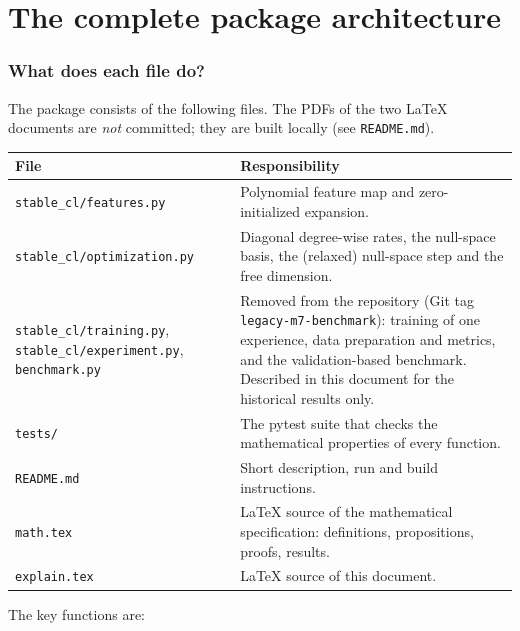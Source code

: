 \documentclass[11pt,a4paper]{article}
\newcommand{\code}[1]{\texttt{#1}}
\begin{document}
\part{The complete package architecture}

\section{What does each file do?}

The package consists of the following files. The PDFs of the two \LaTeX{} documents are \emph{not} committed; they are built locally (see \code{README.md}).

\begin{center}
\begin{tabular}{@{}lp{9.6cm}@{}}
\toprule
File & Responsibility\\
\midrule
\code{stable\_cl/features.py} & Polynomial feature map and zero-initialized expansion.\\
\code{stable\_cl/optimization.py} & Diagonal degree-wise rates, the null-space basis, the (relaxed) null-space step and the free dimension.\\
\code{stable\_cl/training.py}, \code{stable\_cl/experiment.py}, \code{benchmark.py} & Removed from the repository (Git tag \code{legacy-m7-benchmark}): training of one experience, data preparation and metrics, and the validation-based benchmark. Described in this document for the historical results only.\\
\code{tests/} & The pytest suite that checks the mathematical properties of every function.\\
\code{README.md} & Short description, run and build instructions.\\
\code{math.tex} & LaTeX source of the mathematical specification: definitions, propositions, proofs, results.\\
\code{explain.tex} & LaTeX source of this document.\\
\bottomrule
\end{tabular}
\end{center}

The key functions are:
\end{document}
